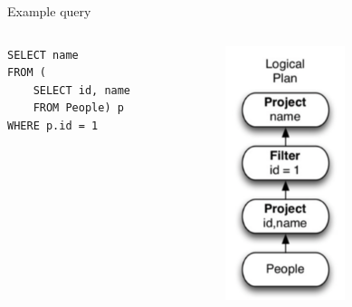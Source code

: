 \begin{frame}[fragile=singleslide]{Example query}
\begin{columns}

\begin{column}{0.5\textwidth}
\begin{verbatim}
SELECT name
FROM (
	SELECT id, name
	FROM People) p
WHERE p.id = 1
\end{verbatim}
\end{column}

\begin{column}{0.5\textwidth}
   	\begin{center}
     		\includegraphics[width=0.5\textwidth]{figures/ex-p1}
   	\end{center}
\end{column}
\end{columns}
\end{frame}

